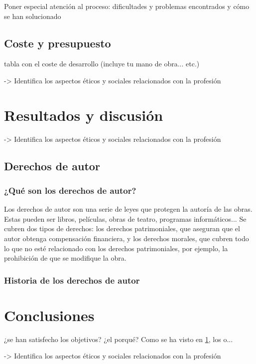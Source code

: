 \documentclass{article}
\begin{document}
 Poner especial atención al proceso: dificultades y problemas encontrados y cómo se han solucionado
 
 \subsection{Coste y presupuesto}
  
  tabla con el coste de desarrollo (incluye tu mano de obra... etc.)
  
->  Identifica los aspectos éticos y sociales relacionados con la profesión

 
\section{Resultados y discusión}\label{sec:ResultadosDisc}

-> Identifica los aspectos éticos y sociales relacionados con la profesión

\subsection{Derechos de autor}
\subsubsection{¿Qué son los derechos de autor?}
Los derechos de autor son una serie de leyes que protegen la autoría de las obras. Estas pueden ser libros, películas, obras de teatro, programas informáticos...\newline
Se cubren dos tipos de derechos: los derechos patrimoniales, que aseguran que el autor obtenga compensación financiera, y los derechos morales, que cubren todo lo que no esté relacionado con los derechos patrimoniales, por ejemplo, la prohibición de que se modifique la obra.\cite{derechos_ompi}

\subsubsection{Historia de los derechos de autor}


\section{Conclusiones}\label{sec:Conclusiones}

 ¿se han satisfecho los objetivos? ¿el porqué? Como se ha visto en \ref{sec:ResultadosDisc}, los o...
 
-> Identifica los aspectos éticos y sociales relacionados con la profesión




\end{document}
